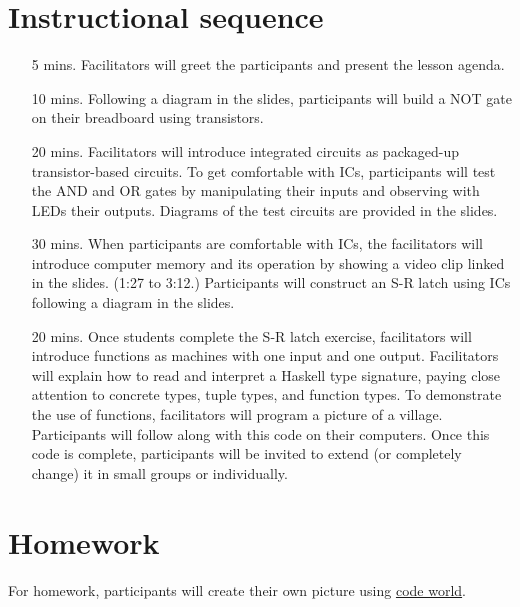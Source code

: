 \documentclass[11pt]{article}
\newcommand{\codeworld}{\href{http://code.world/}{code world}}
\begin{document}
\section*{Instructional sequence}

\begin{itemize}
\item[5 mins.]
  Facilitators will greet the participants and present the lesson agenda.
\item[10 mins.]
  Following a diagram in the slides, participants will build a NOT gate on their
  breadboard using transistors.
\item[20 mins.]
  Facilitators will introduce integrated circuits as packaged-up
  transistor-based circuits.
  To get comfortable with ICs, participants will test the AND and OR gates by
  manipulating their inputs and observing with LEDs their outputs.
  Diagrams of the test circuits are provided in the slides.
\item[30 mins.]
  When participants are comfortable with ICs, the facilitators will introduce
  computer memory and its operation by showing a video clip linked in the
  slides. (1:27 to 3:12.)
  Participants will construct an S-R latch using ICs following a diagram in the
  slides.
\item[20 mins.]
  Once students complete the S-R latch exercise, facilitators will introduce
  functions as machines with one input and one output.
  Facilitators will explain how to read and interpret a Haskell type signature,
  paying close attention to concrete types, tuple types, and function types.
  To demonstrate the use of functions, facilitators will program a picture of a
  village. Participants will follow along with this code on their computers.
  Once this code is complete, participants will be invited to extend (or
  completely change) it in small groups or individually.
\end{itemize}

\section*{Homework}
For homework, participants will create their own picture using \codeworld.
\end{document}
